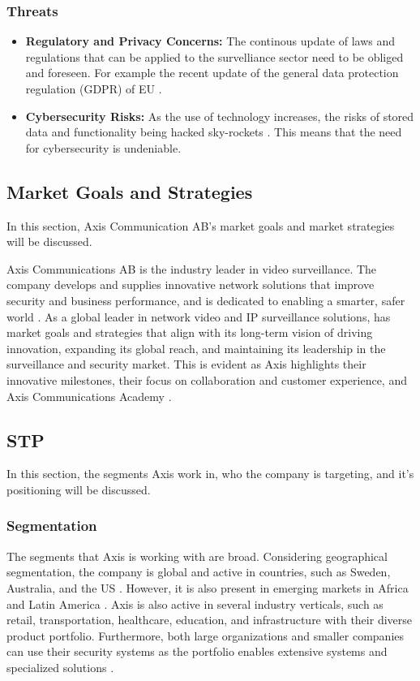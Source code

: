 \documentclass{article}
\begin{document}
\subsubsection{Threats}
\begin{itemize}
    \item \textbf{Regulatory and Privacy Concerns:} The continous update of laws and regulations that can be applied to the survelliance sector need to be obliged and foreseen. For example the recent update of the general data protection regulation (GDPR) of EU \cite{eu_data_protection_regulation}. 
    \item \textbf{Cybersecurity Risks:} As the use of technology increases, the risks of stored data and functionality being hacked sky-rockets \cite{aipix2023}. This means that the need for cybersecurity is undeniable.
\end{itemize}


\subsection{Market Goals and Strategies}
In this section, Axis Communication AB's market goals and market strategies will be discussed.

Axis Communications AB is the industry leader in video surveillance. The company develops and supplies innovative network solutions that improve security and business performance, and is dedicated to enabling a smarter, safer world \cite{axis_about}. As a global leader in network video and IP surveillance solutions, has market goals and strategies that align with its long-term vision of driving innovation, expanding its global reach, and maintaining its leadership in the surveillance and security market. This is evident as Axis highlights their innovative milestones, their focus on collaboration and customer experience, and Axis Communications Academy \cite{axis_website}.

\subsection{STP}
In this section, the segments Axis work in, who the company is targeting, and it's positioning will be discussed. 

\subsubsection{Segmentation}
The segments that Axis is working with are broad. Considering geographical segmentation, the company is global and active in countries, such as Sweden, Australia, and the US \cite{axis_about}. However, it is also present in emerging markets in Africa and Latin America \cite{axis_website}. Axis is also active in several industry verticals, such as retail, transportation, healthcare, education, and infrastructure with their diverse product portfolio. Furthermore, both large organizations and smaller companies can use their security systems as the portfolio enables extensive systems and specialized solutions \cite{axis_homepage}. 
\end{document}
